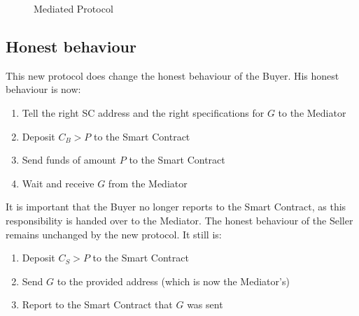 \documentclass{cacthesis}
\begin{document}
\begin{figure}[htb!]
    \centering
    \caption{Mediated Protocol}
    \label{fig:mediated-protocol}
\end{figure}
\subsection{Honest behaviour}
This new protocol does change the honest behaviour of the Buyer. His honest behaviour is now:
\begin{enumerate}
    \item Tell the right SC address and the right specifications for $G$ to the Mediator
    \item Deposit $C_B>P$ to the Smart Contract
    \item Send funds of amount $P$ to the Smart Contract
    \item Wait and receive $G$ from the Mediator
\end{enumerate}
It is important that the Buyer no longer reports to the Smart Contract, as this responsibility is handed over to the Mediator.\newline
The honest behaviour of the Seller remains unchanged by the new protocol. It still is:
\begin{enumerate}
    \item Deposit $C_S>P$ to the Smart Contract
    \item Send $G$ to the provided address (which is now the Mediator's)
    \item Report to the Smart Contract  that $G$ was sent
\end{enumerate}
\end{document}

